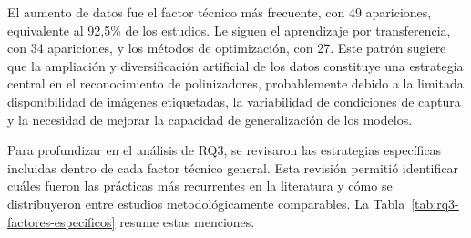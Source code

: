 \vspace{-1.0 cm}
El aumento de datos fue el factor técnico más frecuente, con 49 apariciones, equivalente al 92,5\% de los estudios. Le siguen el aprendizaje por transferencia, con 34 apariciones, y los métodos de optimización, con 27. Este patrón sugiere que la ampliación y diversificación artificial de los datos constituye una estrategia central en el reconocimiento de polinizadores, probablemente debido a la limitada disponibilidad de imágenes etiquetadas, la variabilidad de condiciones de captura y la necesidad de mejorar la capacidad de generalización de los modelos.

Para profundizar en el análisis de RQ3, se revisaron las estrategias específicas incluidas dentro de cada factor técnico general. Esta revisión permitió identificar cuáles fueron las prácticas más recurrentes en la literatura y cómo se distribuyeron entre estudios metodológicamente comparables. La Tabla~\ref{tab:rq3-factores-especificos} resume estas menciones. \\

\begingroup

\setlength{\tabcolsep}{3pt}
\renewcommand{\arraystretch}{1.05}
\scriptsize

\setlength\LTleft{\fill}
\setlength\LTright{\fill}


